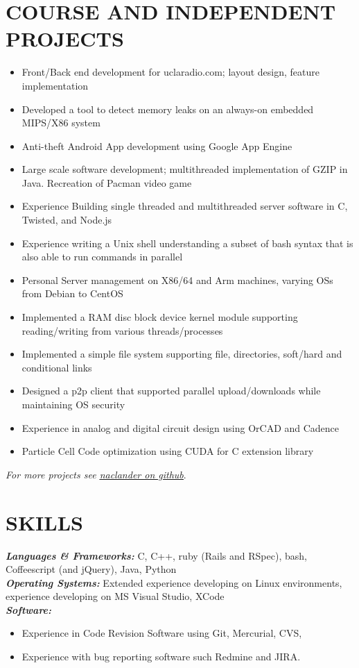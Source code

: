 \documentclass[line,letterpaper]{resume}
\begin{document}
\begin{resume}
\section{\uppercase{Course and Independent Projects}}
	\begin{itemize}
	\item Front/Back end development for uclaradio.com; layout design, feature implementation
	\item Developed a tool to detect memory leaks on an always-on embedded MIPS/X86 system
	\item Anti-theft Android App development using Google App Engine
	\item Large scale software development; multithreaded implementation of GZIP in Java. Recreation of Pacman video game
	\item Experience Building single threaded and multithreaded server software in C, Twisted, and Node.js
	\item Experience writing a Unix shell understanding a subset of bash syntax that is also able to run commands in parallel
	\item Personal Server management on X86/64 and Arm machines, varying OSs from Debian to CentOS
	\item Implemented a RAM disc block device kernel module supporting reading/writing from various threads/processes
	\item Implemented a simple file system supporting file, directories, soft/hard and conditional links
	\item Designed a p2p client that supported parallel upload/downloads while maintaining OS security
	\item Experience in analog and digital circuit design using OrCAD and Cadence
	\item Particle Cell Code optimization using CUDA for C extension library
	\end{itemize}
    \vspace{-6pt}

    \hfill \emph{For more projects see
    \underline{\href{https://github.com/naclander}{naclander on github}}}.

    \vspace{-15pt}

    \section{\uppercase{Skills}}
    {\sl\textbf{Languages \& Frameworks:}}\/
    C, C++, ruby (Rails and RSpec), bash, Coffeescript (and jQuery), Java, Python\\
    {\sl\textbf{Operating Systems:}}\/
	Extended experience developing on Linux environments, experience developing on
	MS Visual Studio, XCode \\
    {\sl\textbf{Software:}}\/
	\begin{itemize}
	\item Experience in Code Revision Software using Git, Mercurial, CVS, 
	\item Experience with bug reporting software such Redmine and JIRA.
	\end{itemize}
    \vspace{-6pt}


\end{resume}
\end{document}
